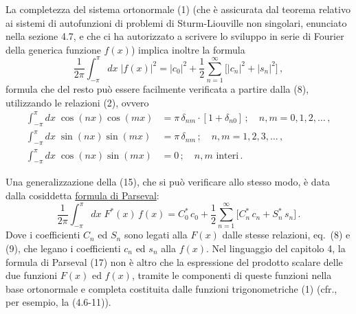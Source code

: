 \documentclass[11pt, a4paper]{book}
\numberwithin{equation}{section}
\begin{document}
La completezza del sistema ortonormale (1) (che è assicurata dal teorema relativo ai sistemi di autofunzioni di problemi di Sturm-Liouville non singolari, enunciato nella sezione 4.7, e che ci ha autorizzato a scrivere lo sviluppo in serie di Fourier della generica funzione $f(x)$) implica inoltre la formula
\begin{equation}
  \frac{1}{2\pi}\int_{-\pi}^{\pi} dx\;|f(x)|^2
  = |c_0|^2 + \frac{1}{2}\sum_{n=1}^{\infty}\bigl[|c_n|^2+|s_n|^2\bigr]\,, \tag{15}
\end{equation}
formula che del resto può essere facilmente verificata a partire dalla (8), utilizzando le relazioni (2), ovvero
\begin{align}
  \int_{-\pi}^{\pi} dx\;\cos(nx)\cos(mx) &= \pi\,\delta_{nm}\cdot[1+\delta_{n0}]\,;\quad n,m=0,1,2,\ldots\,, \tag{16a}\\
  \int_{-\pi}^{\pi} dx\;\sin(nx)\sin(mx) &= \pi\,\delta_{nm}\,;\quad n,m=1,2,3,\ldots\,, \tag{16b}\\
  \int_{-\pi}^{\pi} dx\;\cos(nx)\sin(mx) &= 0\,;\quad n,m \text{ interi}\,. \tag{16c}
\end{align}

Una generalizzazione della (15), che si può verificare allo stesso modo, è data dalla cosiddetta \underline{formula di Parseval}:
\begin{equation}
  \frac{1}{2\pi}\int_{-\pi}^{\pi} dx\;F^*(x)\,f(x)
  = C_0^*\,c_0 + \frac{1}{2}\sum_{n=1}^{\infty}\bigl[C_n^*\,c_n + S_n^*\,s_n\bigr]\,. \tag{17}
\end{equation}
Dove i coefficienti $C_n$ ed $S_n$ sono legati alla $F(x)$ dalle stesse relazioni, eq.\ (8) e (9), che legano i coefficienti $c_n$ ed $s_n$ alla $f(x)$. Nel linguaggio del capitolo 4, la formula di Parseval (17) non è altro che la espressione del prodotto scalare delle due funzioni $F(x)$ ed $f(x)$, tramite le componenti di queste funzioni nella base ortonormale e completa costituita dalle funzioni trigonometriche (1) (cfr., per esempio, la (4.6-11)).
\end{document}
